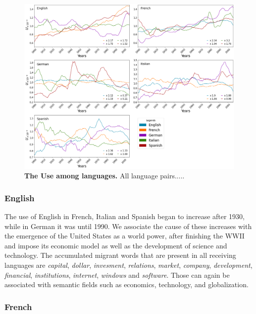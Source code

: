 \documentclass[10pt,letterpaper]{article} %
\begin{document}
	
	\begin{figure}[!h]
		\begin{adjustwidth}{-6cm}{1cm}
			\centering
			\includegraphics[scale=0.38]{USO_A.png}
			\caption{{\bf The Use among languages.} All language pairs.....}
			\label{fig.UT_art}
		\end{adjustwidth}
	\end{figure}
	\subsubsection*{English} %
	
	The use of English in French, Italian and Spanish began to increase after 1930, while in German it was until 1990. We associate the cause of these increases with the emergence of the United States as a world power, after finishing the WWII and  impose its economic model as well as the development of science and technology. The accumulated migrant words that are present in all receiving  languages are \textit{capital}, \textit{dollar}, \textit{invesment}, \textit{relations}, \textit{market}, \textit{company}, \textit{development}, \textit{financial},  \textit{institutions}, \textit{internet}, \textit{windows} and \textit{software}. Those can again be associated with semantic fields such as economics, technology, and globalization.
	
	\subsubsection*{French} %
	
\end{document}
